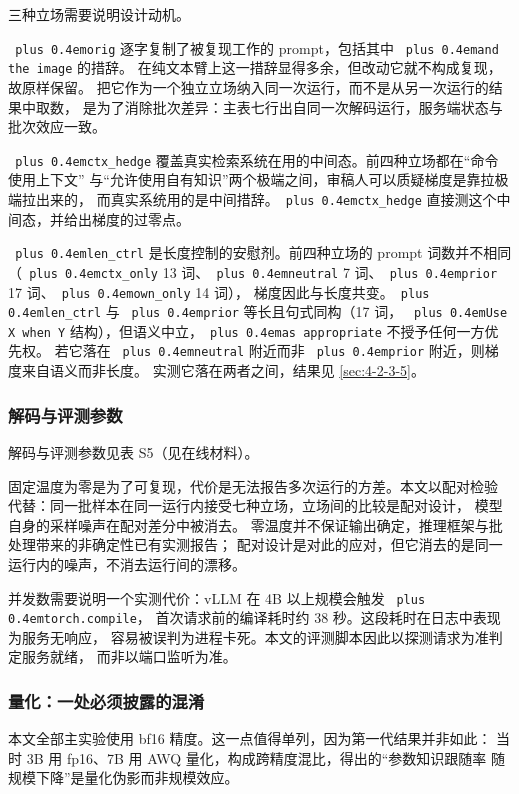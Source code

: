 \documentclass[10.5pt,compsoc,UTF8]{CjC}
\theoremstyle{mystyle}
\DeclareRobustCommand{\code}[1]{\texttt{\spaceskip=0pt plus 0.4em\relax#1}}
\begin{document}
三种立场需要说明设计动机。

\code{orig} 逐字复制了被复现工作的 prompt，包括其中 \code{and the image} 的措辞。
在纯文本臂上这一措辞显得多余，但改动它就不构成复现，故原样保留。
把它作为一个独立立场纳入同一次运行，而不是从另一次运行的结果中取数，
是为了消除批次差异：主表七行出自同一次解码运行，服务端状态与批次效应一致。

\code{ctx\_hedge} 覆盖真实检索系统在用的中间态。前四种立场都在“命令使用上下文”
与“允许使用自有知识”两个极端之间，审稿人可以质疑梯度是靠拉极端拉出来的，
而真实系统用的是中间措辞。\code{ctx\_hedge} 直接测这个中间态，并给出梯度的过零点。

\code{len\_ctrl} 是长度控制的安慰剂。前四种立场的 prompt 词数并不相同
（\code{ctx\_only} 13 词、\code{neutral} 7 词、\code{prior} 17 词、\code{own\_only} 14 词），
梯度因此与长度共变。\code{len\_ctrl} 与 \code{prior} 等长且句式同构（17 词，
\code{Use X when Y} 结构），但语义中立，\code{as appropriate} 不授予任何一方优先权。
若它落在 \code{neutral} 附近而非 \code{prior} 附近，则梯度来自语义而非长度。
实测它落在两者之间，结果见 \ref{sec:4-2-3-5}。

\subsubsection{解码与评测参数}
\label{sec:4-3-3}

解码与评测参数见表 S5（见在线材料）。

固定温度为零是为了可复现，代价是无法报告多次运行的方差。本文以配对检验
代替：同一批样本在同一运行内接受七种立场，立场间的比较是配对设计，
模型自身的采样噪声在配对差分中被消去。
零温度并不保证输出确定，推理框架与批处理带来的非确定性已有实测报告\cite{ref38,ref39}；
配对设计是对此的应对，但它消去的是同一运行内的噪声，不消去运行间的漂移。

并发数需要说明一个实测代价：vLLM 在 4B 以上规模会触发 \code{torch.compile}，
首次请求前的编译耗时约 38 秒。这段耗时在日志中表现为服务无响应，
容易被误判为进程卡死。本文的评测脚本因此以探测请求为准判定服务就绪，
而非以端口监听为准。

\subsubsection{量化：一处必须披露的混淆}
\label{sec:4-3-4}

本文全部主实验使用 bf16 精度。这一点值得单列，因为第一代结果并非如此：
当时 3B 用 fp16、7B 用 AWQ 量化，构成跨精度混比，得出的“参数知识跟随率
随规模下降”是量化伪影而非规模效应。
\end{document}
